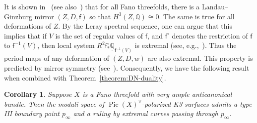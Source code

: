 \documentclass[10pt]{amsart}
\numberwithin{equation}{section}
\theoremstyle{plain}
\newtheorem{corollary}[theorem]{Corollary}
\theoremstyle{definition}
\theoremstyle{remark}
\DeclareMathOperator{\Pic}{Pic}
\begin{document}
It is shown in~\cite{przyjalkowski2017compactification} (see also~\cite{cheltsov2018katzarkov}) that for all Fano threefolds, there is a Landau--Ginzburg mirror \((Z,D,\mathsf{f})\) so that \(H^3(Z,\mathbb{Q})\cong 0\). The same is true for all deformations of \(Z\). By the Leray spectral sequence, one can argue that this implies that if \(V\) is the set of regular values of \(\mathsf{f}\), and \(\mathsf{f}^\circ\) denotes the restriction of \(\mathsf{f}\) to \(\mathsf{f}^{-1}(V)\), then local system \(R^2\mathsf{f}_*^\circ\underline{\mathbb{Q}}_{\mathsf{f}^{-1}(V)}\) is extremal (see, e.g.,~\cite[Proof of Lemma 3.2]{doran2016calabi}). Thus the period maps of any deformation of \((Z,D,w)\) are also extremal. This property is predicted by mirror symmetry (see~\cite{harder2016geometry,shamoto2018hodge}). Consequently, we have the following result when combined with Theorem~\ref{theorem:DN-duality}.

\begin{corollary}\label{corollary:ssur}
  Suppose \(X\) is a Fano threefold with very ample anticanonical bundle. Then the moduli space of \(\Pic(X)^\vee\)-polarized K3 surfaces admits a type III boundary point \(p_\infty\) and a ruling by extremal curves passing through \(p_\infty\).
\end{corollary}
\end{document}
